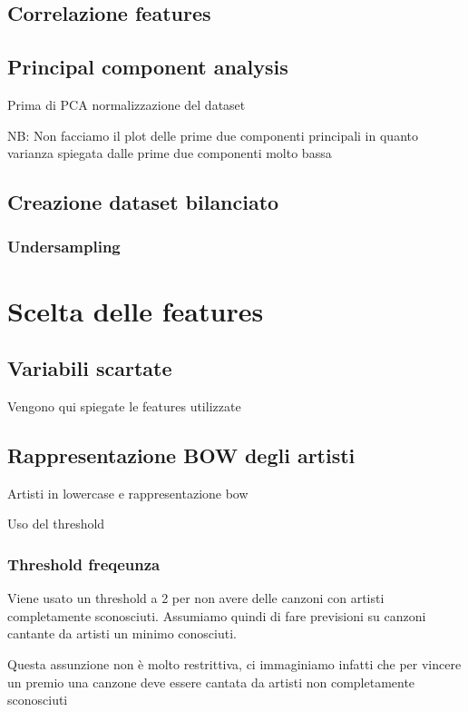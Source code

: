 \subsection{Correlazione features}
\label{sec:correlazione}

\subsection{Principal component analysis}
Prima di PCA normalizzazione del dataset

NB: Non facciamo il plot delle prime due componenti principali in quanto varianza spiegata dalle prime due componenti molto bassa

\subsection{Creazione dataset bilanciato}
\subsubsection{Undersampling}


\section{Scelta delle features}

\subsection{Variabili scartate}

Vengono qui spiegate le features utilizzate
\subsection{Rappresentazione BOW degli artisti}
Artisti in lowercase e rappresentazione bow

Uso del threshold

\subsubsection{Threshold freqeunza}
Viene usato un threshold a 2 per non avere delle canzoni con artisti completamente sconosciuti. Assumiamo quindi di fare previsioni su canzoni cantante da artisti un minimo conosciuti.

Questa assunzione non è molto restrittiva, ci immaginiamo infatti che per vincere un premio una canzone deve essere cantata da artisti non completamente sconosciuti

